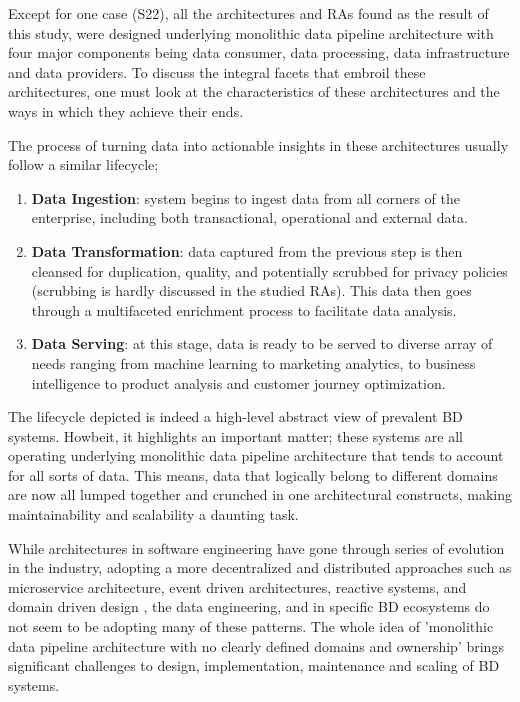 \documentclass{ieeeaccess}
\begin{document}
Except for one case (S22), all the architectures and RAs found as the result of this study, were designed underlying monolithic data pipeline architecture with four major components being data consumer, data processing, data infrastructure and data providers. To discuss the integral facets that embroil these architectures, one must look at the characteristics of these architectures and the ways in which they achieve their ends.

The process of turning data into actionable insights in these architectures usually follow a similar lifecycle;

\begin{enumerate}
    \item \textbf{Data Ingestion}: system begins to ingest data from all corners of the enterprise, including both transactional, operational and external data.
    \item \textbf{Data Transformation}: data captured from the previous step is then cleansed for duplication, quality, and potentially scrubbed for privacy policies (scrubbing is hardly discussed in the studied RAs). This data then goes through a multifaceted enrichment process to facilitate data analysis.
    \item \textbf{Data Serving}: at this stage, data is ready to be served to diverse array of needs ranging from machine learning to marketing analytics, to business intelligence to product analysis and customer journey optimization.
\end{enumerate}

The lifecycle depicted is indeed a high-level abstract view of prevalent BD systems. Howbeit, it highlights an important matter; these systems are all operating underlying monolithic data pipeline architecture that tends to account for all sorts of data. This means, data that logically belong to different domains are now all lumped together and crunched in one architectural constructs, making maintainability and scalability a daunting task.

While architectures in software engineering have gone through series of evolution in the industry, adopting a more decentralized and distributed approaches such as microservice architecture, event driven architectures, reactive systems, and domain driven design , the data engineering, and in specific BD ecosystems do not seem to be adopting many of these patterns. The whole idea of 'monolithic data
pipeline architecture with no clearly defined domains and ownership' brings significant challenges to design, implementation, maintenance and scaling of BD systems.
\end{document}
